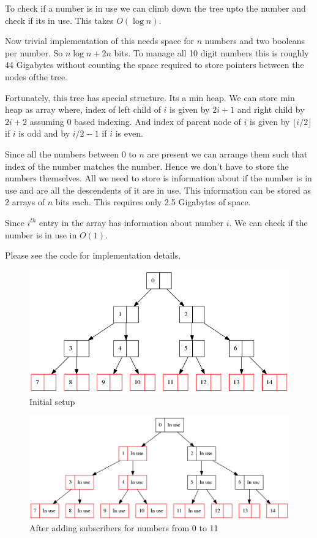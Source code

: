 \documentclass{article}
\begin{document}
To check if a number is in use we can climb down the tree upto the number and check if 
its in use. This takes $O(\log n)$.

Now trivial implementation of this needs space for $n$ numbers and two booleans
per number. So $n \log n + 2 n$ bits. To manage all 10 digit numbers this is
roughly 44 Gigabytes without counting the space required to store pointers
between the nodes ofthe tree. 

Fortunately, this tree has special structure. Its a min heap. We can store min
heap as array where, index of left child of $i$ is given by $2i + 1$ and right
child by $2i +2$ assuming 0 based indexing. And index of parent node of $i$ is
given by $\lfloor i /2 \rfloor$ if $i$ is odd and by $i/2 - 1$ if $i$ is even. 

Since all the numbers between 0 to $n$ are present we can arrange them such
that index of the number matches the number. Hence we don't have to store the
numbers themselves. All we need to store is information about if the number is
in use and are all the descendents of it are in use. This information can be
stored as 2 arrays of $n$ bits each. This requires only 2.5 Gigabytes of space. 

Since $i^{th}$ entry in the array has information about number $i$. We can
check if the number is in use in $O(1)$. 

Please see the code for implementation details. 

\begin{figure}[H]
    \includegraphics[width=\textwidth]{init}
    \caption{Initial setup}
    \label{fig:init}
\end{figure}

\begin{figure}[H]
    \includegraphics[width=\textwidth]{addupto11}
    \caption{After adding subscribers for numbers from 0 to 11}
    \label{fig:addupto11}
\end{figure}
\end{document}
